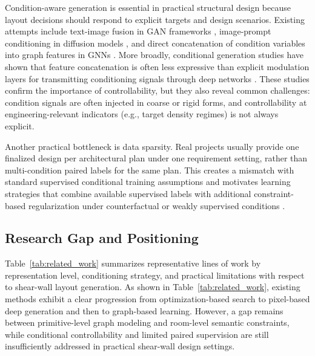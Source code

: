Condition-aware generation is essential in practical structural design because layout decisions should respond to explicit targets and design scenarios. Existing attempts include text-image fusion in GAN frameworks \cite{liaoIntelligentGenerativeStructural2022a}, image-prompt conditioning in diffusion models \cite{guIntelligentDesignShear2024,zhouStructDiffusionEndendIntelligent2024}, and direct concatenation of condition variables into graph features in GNNs \cite{zhaoDesignconditioninformedShearWall2023d}. More broadly, conditional generation studies have shown that feature concatenation is often less expressive than explicit modulation layers for transmitting conditioning signals through deep networks \cite{perezFiLMVisualReasoning2018,huangUnifiedConditionalDiffusion2024}. These studies confirm the importance of controllability, but they also reveal common challenges: condition signals are often injected in coarse or rigid forms, and controllability at engineering-relevant indicators (e.g., target density regimes) is not always explicit.

Another practical bottleneck is data sparsity. Real projects usually provide one finalized design per architectural plan under one requirement setting, rather than multi-condition paired labels for the same plan. This creates a mismatch with standard supervised conditional training assumptions and motivates learning strategies that combine available supervised labels with additional constraint-based regularization under counterfactual or weakly supervised conditions \cite{dasConditionalSyntheticData2022,chenCounterfactualSamplesSynthesizing2023,pavlloControllingStyleSemantics2020}.

\subsection{Research Gap and Positioning}
\label{subsec:research_gap}

Table~\ref{tab:related_work} summarizes representative lines of work by representation level, conditioning strategy, and practical limitations with respect to shear-wall layout generation. As shown in Table~\ref{tab:related_work}, existing methods exhibit a clear progression from optimization-based search to pixel-based deep generation and then to graph-based learning. However, a gap remains between primitive-level graph modeling and room-level semantic constraints, while conditional controllability and limited paired supervision are still insufficiently addressed in practical shear-wall design settings. 

